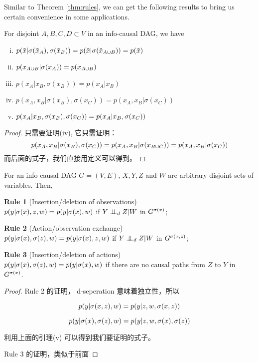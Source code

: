 Similar to Theorem \ref{thm:rules}, we
can get the following results to bring us certain convenience in some applications.


\begin{Lem}
For disjoint $A, B, C, D \subset V$ in an info-causal DAG, we have

\begin{enumerate}[i)]
    \item $p(\tilde{x}|\mathrm{\sigma}(\tilde{x}_A), \mathrm{\sigma}(\tilde{x}_B)) = p(\tilde{x}|\mathrm{\sigma}(\tilde{x}_{A\cup B})) = p(\tilde{x})$
    \item $p(x_{A\cup B}|\mathrm{\sigma}(x_A)) = p(x_{A\cup B})$
    \item $p(x_A|x_B, \sigma(x_B)) = p(x_A|x_B)$
    \item $p(x_A, x_B | \sigma(x_B), \sigma(x_C)) = p(x_A, x_B |\sigma(x_C))$
    \item $p(x_A|x_B, \sigma(x_B), \sigma(x_C)) = p(x_A|x_B, \mathrm{\sigma}(x_C))$
\end{enumerate}
\end{Lem}

\begin{proof}
只需要证明(iv), 它只需证明：
$$p(x_A, x_B| \sigma(x_B), \sigma(x_C)) = p(x_A, x_B|\mathrm{\sigma}(x_{B\cup C})) = p(x_A, x_B |\sigma(x_C))$$
而后面的式子，我们直接用定义可以得到。
\end{proof}


\begin{Thm}
	\label{thm:rules}
	For an info-causal DAG $G=(V, E)$, $X, Y, Z$ and $W$ are arbitrary disjoint sets of variables. Then, 
	
	\textbf{Rule 1} (Insertion/deletion of observations) \\
	$p(y|\mathrm{\sigma}(x), z, w) = p(y|\mathrm{\sigma}(x), w)$ if $Y \perp\mkern-9.5mu\perp_d Z|W$ in $G^{\mathrm{\sigma}(x)}$;
	
	\textbf{Rule 2} (Action/observation exchange) \\
	$p(y|\mathrm{\sigma}(x), \mathrm{\sigma}(z), w) = p(y|\mathrm{\sigma}(x), z, w)$ if $Y\perp\mkern-9.5mu\perp_d Z|W$ in $G^{\mathrm{\sigma}(x, z)}$;
	
	\textbf{Rule 3} (Insertion/deletion of actions) \\
	$p(y|\mathrm{\sigma}(x), \mathrm{\sigma}(z), w) = p(y|\mathrm{\sigma}(x), w)$ if there are no causal paths from $Z$ to $Y$ in $G^{\mathrm{\sigma}(x)}$.  
\end{Thm}

\begin{proof}
Rule 2 的证明， d-seperation 意味着独立性，所以

$$p(y|\mathrm{\sigma}(x, z), w) = p(y|z, w, \mathrm{\sigma}(x, z))$$

$$p(y|\mathrm{\sigma}(x), \mathrm{\sigma}(z), w) = p(y|z, w, \mathrm{\sigma}(x), \mathrm{\sigma}(z))$$

利用上面的引理(v) 可以得到我们要证明的式子。

Rule 3 的证明，类似于前面


\end{proof}





